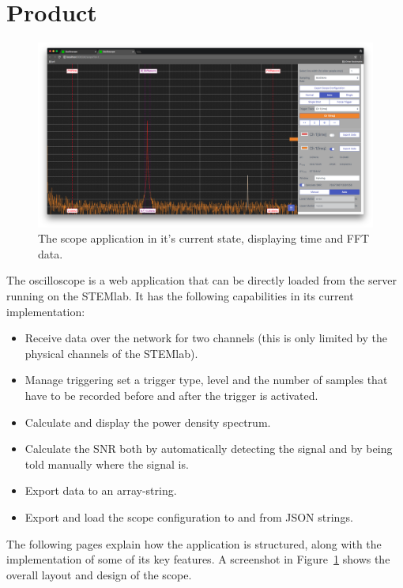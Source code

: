 %
%
\section{Product} %
\label{sec:gui:product}

\begin{figure}
    \centering
    \includegraphics[width=1\textwidth]{images/gui/scope}
    \caption[The Scope Application]{%
        The scope application in it's current state, displaying time and FFT data.%
    }
    \label{fig:gui:screenshot}
\end{figure}

The oscilloscope  is a web  application that can  be directly loaded  from the
server  running on  the  STEMlab. It  has the  following  capabilities in  its
current implementation:
\begin{itemize}\tightlist
    \item 
        Receive data over  the network for two channels (this  is only limited
        by the physical channels of the STEMlab).
    \item 
        Manage triggering set a trigger type,  level and the number of samples
        that have to be recorded before and after the trigger is activated.
    \item 
        Calculate and display the power density spectrum.
    \item 
        Calculate the  SNR both by  automatically detecting the signal  and by
        being told manually where the signal is.
    \item 
        Export data to an array-string.
    \item 
        Export and load the scope configuration to and from JSON strings.
\end{itemize}
The  following  pages  explain  how   the  application  is  structured,  along
with  the  implementation  of  some  of  its  key  features. A  screenshot  in
Figure~\ref{fig:gui:screenshot}  shows the  overall layout  and design  of the
scope.


